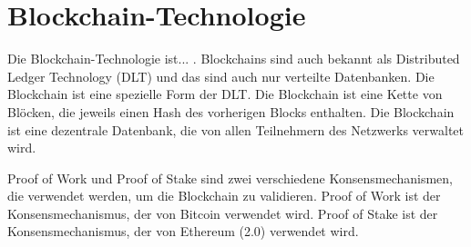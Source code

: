 \section{Blockchain-Technologie}
Die Blockchain-Technologie ist... . Blockchains sind auch bekannt als Distributed Ledger 
Technology (DLT) und das sind auch nur verteilte Datenbanken. Die Blockchain ist eine
spezielle Form der DLT. Die Blockchain ist eine Kette von Blöcken, die jeweils einen
Hash des vorherigen Blocks enthalten. Die Blockchain ist eine dezentrale Datenbank, die
von allen Teilnehmern des Netzwerks verwaltet wird.

Proof of Work und Proof of Stake sind zwei verschiedene Konsensmechanismen, die verwendet
werden, um die Blockchain zu validieren. Proof of Work ist der Konsensmechanismus, der
von Bitcoin verwendet wird. Proof of Stake ist der Konsensmechanismus, der von Ethereum (2.0)
verwendet wird.


